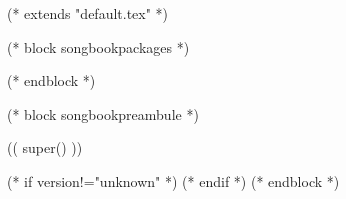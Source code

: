 (* extends "default.tex" *)

(* block songbookpackages *)
\usepackage[((booktype)),
            (* for option in bookoptions *)((option)),
            (* endfor *)
            (* for instrument in instruments *)((instrument)),
            (* endfor *)]{crepbook}
(* endblock *)

(* block songbookpreambule *)
   \usepackage[
     a4paper %
     ,includeheadfoot %
     ,hmarginratio=1:1 %
     ,outer=1.8cm %
     ,vmarginratio=1:1 %
     ,bmargin=1.3cm %
     ]{geometry}

  (( super() ))

   \pagestyle{empty}


   \renewcommand{\snumbgcolor}{SongNumberBgColor}
   \renewcommand{\notebgcolor}{NoteBgColor}
   \renewcommand{\idxbgcolor}{IndexBgColor}

  \usepackage[bookmarks,
                  bookmarksopen,
                  hyperfigures=true,
                  colorlinks=true,
                  linkcolor=tango-green-3,
                  urlcolor=tango-blue-3]{hyperref}


   \subtitle{((subtitle))}
   (* if version!="unknown" *)
   (* endif *)
(* endblock *)
